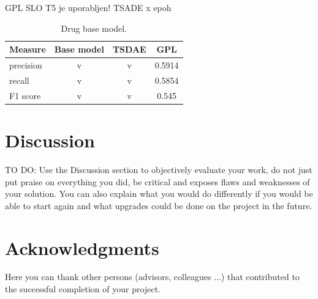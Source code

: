 \documentclass[fleqn,moreauthors,10pt]{ds_report}
\begin{document}
GPL SLO T5 je uporabljen!
TSADE x epoh

\begin{table}[!h]
	\footnotesize
	\begin{center}
		\begin{tabular}{ |l|c|c|c| }
		\hline
		\rowcolor{Red}Measure & Base model & TSDAE & GPL \\
		\hline

		precision & v & v & 0.5914\\
		recall & v & v & 0.5854\\
		F1 score & v & v & 0.545\\

		\hline
		\end{tabular}
	\end{center}
\caption{Drug base model.}
\label{tab5}
\end{table}





\section*{Discussion}

TO DO:
Use the Discussion section to objectively evaluate your work, do not just put praise on everything you did, be critical and exposes flaws and weaknesses of your solution. You can also explain what you would do differently if you would be able to start again and what upgrades could be done on the project in the future.






\section*{Acknowledgments}

Here you can thank other persons (advisors, colleagues ...) that contributed to the successful completion of your project.




\end{document}
